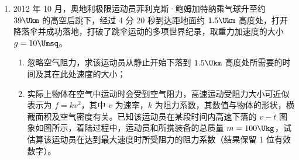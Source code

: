 \documentclass[\gkver]{gaokaozhenti}
\begin{document}
\begin{enumerate}
\item
2012 年 10 月，奥地利极限运动员菲利克斯·鲍姆加特纳乘气球升至约 $39\Ukm$ 的高空后跳下，经过 4 分 20 秒到达距地面约 $1.5\Ukm$ 高度处，打开降落伞并成功落地，打破了跳伞运动的多项世界纪录，取重力加速度的大小 $g=10\Umsq$。
\begin{enumerate}
	\item
	忽略空气阻力，求该运动员从静止开始下落到 $1.5\Ukm$ 高度处所需要的时间及其在此处速度的大小；
	\item
	实际上物体在空气中运动时会受到空气阻力，高速运动受阻力大小可近似表示为 $f=kv^{2}$，其中 $v$ 为速率，$k$ 为阻力系数，其数值与物体的形状，横截面积及空气密度有关。已知该运动员在某段时间内高速下落的 $v-t$ 图象如图所示，着陆过程中，运动员和所携装备的总质量 $m=100\Ukg$，试估算该运动员在达到最大速度时所受阻力的阻力系数（结果保留 1 位有效数字）。
\end{enumerate}


\end{enumerate}
\end{document}

